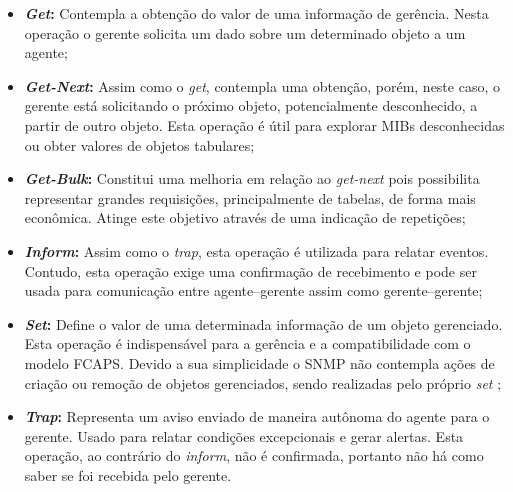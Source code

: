 \documentclass[twoside,english,brazilian]{UNISINOSmonografia}
\begin{document}
\begin{itemize}

\item \textbf{\textit{Get}:}
Contempla a obtenção do valor de uma informação de gerência. Nesta operação o 
gerente solicita um dado sobre um determinado objeto a um agente;

\item \textbf{\textit{Get-Next}:}
Assim como o \textit{get}, contempla uma obtenção, porém, neste caso, o 
gerente está solicitando o próximo objeto, potencialmente desconhecido, a 
partir de outro objeto. 
Esta operação é útil para explorar MIBs desconhecidas ou obter valores 
de objetos tabulares;

\item \textbf{\textit{Get-Bulk}:}
Constitui uma melhoria em relação ao \textit{get-next} pois possibilita 
representar grandes requisições, principalmente de tabelas, de forma mais 
econômica.
Atinge este objetivo através de uma indicação de repetições;

\item \textbf{\textit{Inform}:}
Assim como o \textit{trap}, esta operação é utilizada para relatar eventos.
Contudo, esta operação exige uma confirmação de recebimento e pode ser usada 
para comunicação entre agente--gerente assim como gerente--gerente;

\item \textbf{\textit{Set}:}
Define o valor de uma determinada informação de um objeto gerenciado. 
Esta operação é indispensável para a gerência e a compatibilidade com o 
modelo FCAPS. 
Devido a sua simplicidade o SNMP não contempla ações de criação ou remoção de 
objetos gerenciados, sendo realizadas pelo próprio \textit{set}
;

\item \textbf{\textit{Trap}:}
Representa um aviso enviado de maneira autônoma do agente para o gerente. 
Usado para relatar condições excepcionais e gerar alertas.
Esta operação, ao contrário do \textit{inform}, não é confirmada, portanto
não há como saber se foi recebida pelo gerente.

\end{itemize}
\end{document}
